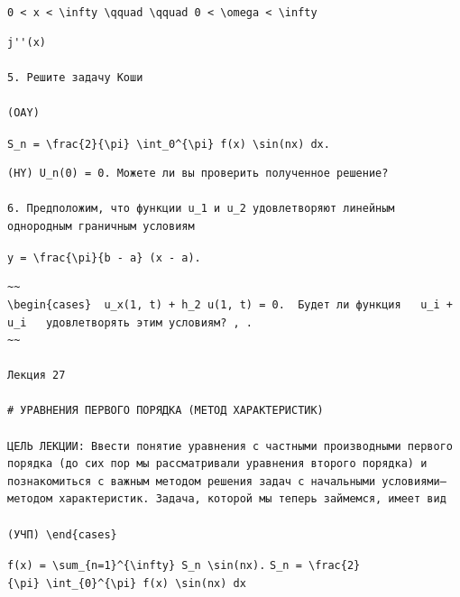 \documentclass[
  ukrainian,
]{article}
\begin{document}
\texttt{0\ \textless{}\ x\ \textless{}\ \textbackslash{}infty\ \textbackslash{}qquad\ \textbackslash{}qquad\ 0\ \textless{}\ \textbackslash{}omega\ \textless{}\ \textbackslash{}infty}

\begin{verbatim}
j''(x)

5. Решите задачу Коши

(OAY)
\end{verbatim}

\texttt{S\_n\ =\ \textbackslash{}frac\{2\}\{\textbackslash{}pi\}\ \textbackslash{}int\_0\^{}\{\textbackslash{}pi\}\ f(x)\ \textbackslash{}sin(nx)\ dx.}

\begin{verbatim}
(HY) U_n(0) = 0. Можете ли вы проверить полученное решение?

6. Предположим, что функции u_1 и u_2 удовлетворяют линейным однородным граничным условиям
\end{verbatim}

\texttt{y\ =\ \textbackslash{}frac\{\textbackslash{}pi\}\{b\ -\ a\}\ (x\ -\ a).}

\begin{verbatim}
~~
\begin{cases}  u_x(1, t) + h_2 u(1, t) = 0.  Будет ли функция   u_i + u_i   удовлетворять этим условиям? , .
~~

Лекция 27

# УРАВНЕНИЯ ПЕРВОГО ПОРЯДКА (МЕТОД ХАРАКТЕРИСТИК)

ЦЕЛЬ ЛЕКЦИИ: Ввести понятие уравнения с частными производными первого порядка (до сих пор мы рассматривали уравнения второго порядка) и познакомиться с важным методом решения задач с начальными условиями—методом характеристик. Задача, которой мы теперь займемся, имеет вид

(УЧП) \end{cases}
\end{verbatim}

\texttt{f(x)\ =\ \textbackslash{}sum\_\{n=1\}\^{}\{\textbackslash{}infty\}\ S\_n\ \textbackslash{}sin(nx).}
\texttt{S\_n\ =\ \textbackslash{}frac\{2\}\{\textbackslash{}pi\}\ \textbackslash{}int\_\{0\}\^{}\{\textbackslash{}pi\}\ f(x)\ \textbackslash{}sin(nx)\ dx}
\end{document}

